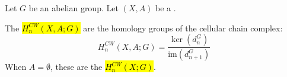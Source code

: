 \begin{definition} \label{definition:relative_absolute_cellular_homology_groups_of_CW_pair_complex}
Let $G$ be an abelian group. Let $(X, A)$ be a .  

The  \hl{$H_n^{CW}(X, A; G)$} are the homology groups of the cellular chain complex:
$$H_n^{CW}(X, A; G) = \frac{\ker(d_n^G)}{\text{im}(d_{n+1}^G)}$$
When $A = \emptyset$, these are the  \hl{$H_n^{CW}(X; G)$}.
\end{definition}